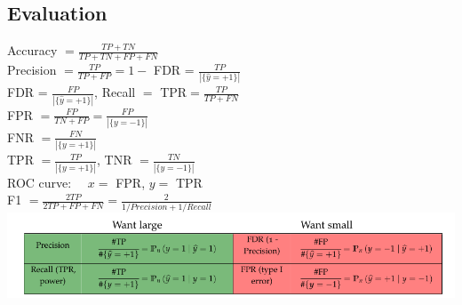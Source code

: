\subsection*{Evaluation}
Accuracy $=\frac{TP+TN}{TP+TN+FP+FN}$\\
Precision $=\frac{TP}{TP+FP} = 1-$ FDR = $\frac{TP}{|\{\hat{y} = +1\}|}$\\
FDR = $\frac{FP}{|\{\hat{y} = +1\}|}$, Recall $=$ TPR$ =\frac{TP}{TP+FN}$\\
FPR $=\frac{FP}{TN+FP} = \frac{FP}{|\{y = -1\}|}$\\
FNR $=\frac{FN}{|\{ y = +1 \}|}$\\
TPR $=\frac{TP}{|\{ y = +1 \}|}$, TNR $=\frac{TN}{|\{ y = -1 \}|}$\\
ROC curve: \ \ $x=$ FPR, $y=$ TPR\\
F1 $=\frac{2TP}{2TP+FP+FN}=\frac{2}{1/Precision+1/Recall}$\\
\hspace*{-10mm}
\includegraphics[width=1.25 \linewidth]{matrix.png}
